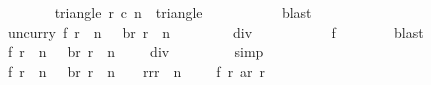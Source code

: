 \begin{isabellebody}
\ \ \ \ \ \ \isamarkupfalse%
\ {\isacartoucheopen}triangle\ r{}\ c{}\ n\ {\isasymsubseteq}\ triangle\ {}\ {}\ {}{}{}{}{\isacartoucheclose}\isanewline
\ \ \ \ \ \ \isamarkupfalse%
\ blast\isanewline
\ \ \ \ \isamarkupfalse%
\ {\isachardoublequoteopen}{\isacharparenleft}uncurry\ f{\isacharparenright}\ {\isacharparenleft}r{}\ {\isacharplus}\ n\ {\isacharminus}\ {}{\isacharcomma}\ br\ {\isacharparenleft}r{}\ {\isacharplus}\ n\ {\isacharminus}\ {}{\isacharparenright}{\isacharparenright}\ {\isasymin}\ {\isacharbraceleft}{}{\isachardot}{\isachardot}{\isacharless}{}{}{}{}\ {\isacharasterisk}\ {\isacharparenleft}{}{}{}{}\ {\isacharplus}\ {}{\isacharparenright}\ div\ {}\ {\isacharplus}\ {}{\isacharbraceright}{\isachardoublequoteclose}\isanewline
\ \ \ \ \ \ \isamarkupfalse%
\ f{\isacharparenleft}{}{\isacharparenright}\isanewline
\ \ \ \ \ \ \isamarkupfalse%
\ blast\isanewline
\ \ \ \ \isamarkupfalse%
\ {\isachardoublequoteopen}f\ {\isacharparenleft}r{}\ {\isacharplus}\ n\ {\isacharminus}\ {}{\isacharparenright}\ {\isacharparenleft}br\ {\isacharparenleft}r{}\ {\isacharplus}\ n\ {\isacharminus}\ {}{\isacharparenright}{\isacharparenright}\ {\isasymle}\ {}{}{}{}{\isacharasterisk}{\isacharparenleft}{}{}{}{}{\isacharplus}{}{\isacharparenright}\ div\ {}{\isachardoublequoteclose}\isanewline
\ \ \ \ \ \ \isamarkupfalse%
\ simp\isanewline
\isanewline
\ \ \ \ \isamarkupfalse%
\isanewline
\isanewline
\ \ \ \ \isamarkupfalse%
\ {\isachardoublequoteopen}f\ {\isacharparenleft}r{}\ {\isacharplus}\ n\ {\isacharminus}\ {}{\isacharparenright}\ {\isacharparenleft}br\ {\isacharparenleft}r{}\ {\isacharplus}\ n\ {\isacharminus}\ {}{\isacharparenright}{\isacharparenright}\ {\isacharequal}\ {\isacharparenleft}{\isasymSum}r{\isacharprime}{\isasymleftarrow}{\isacharbrackleft}r{}{\isachardot}{\isachardot}{\isacharless}{\isacharparenleft}r{}\ {\isacharplus}\ n\ {\isacharminus}\ {}{\isacharparenright}\ {\isacharplus}\ {}{\isacharbrackright}{\isachardot}\ f\ r{\isacharprime}\ {\isacharparenleft}ar\ r{\isacharprime}{\isacharparenright}{\isacharparenright}{\isachardoublequoteclose}\isanewline

\end{isabellebody}
